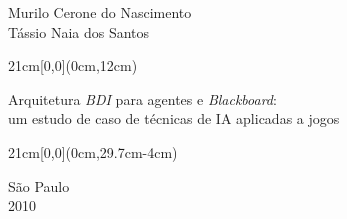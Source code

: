 \begin{center}
  {\large Murilo Cerone do Nascimento \\
    Tássio Naia dos Santos}
\end{center}

\begin{textblock*}{21cm}[0,0](0cm,12cm)
  \begin{center}
    {\LARGE Arquitetura \emph{BDI} para agentes e \emph{Blackboard}:\\
      um estudo de caso de técnicas de IA aplicadas a jogos}
  \end{center}
\end{textblock*}


\begin{textblock*}{21cm}[0,0](0cm,29.7cm-4cm)
  \begin{center}
    {\large São Paulo \\ 2010 }
  \end{center}
\end{textblock*}


